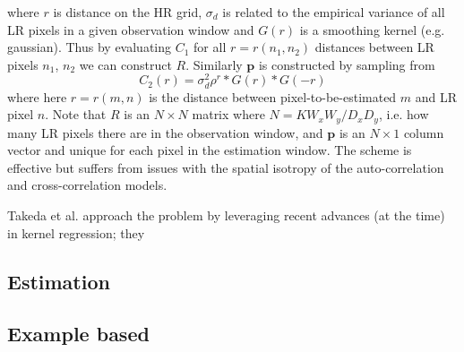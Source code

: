 where $r$ is distance on the HR grid, $\sigma_d$ is related to the empirical variance of all LR pixels in a given observation window and $G(r)$ is a smoothing kernel (e.g. gaussian).
%
Thus by evaluating $C_1$ for all $r = r(n_1, n_2)$ distances between LR pixels $n_1$, $n_2$ we can construct $R$.
%
Similarly $\bm{p}$ is constructed by sampling from
\begin{equation}
    C_2(r) = \sigma_d^2 \rho^{r} \ast G(r) \ast G(-r)
\end{equation}
where here $r = r(m, n)$ is the distance between pixel-to-be-estimated $m$ and LR pixel $n$.
%
Note that $R$ is an $N \times N$ matrix where $N = K W_x W_y/D_x D_y$, i.e. how many LR pixels there are in the observation window, and $\bm{p}$ is an $N \times 1$ column vector and unique for each pixel in the estimation window.
%
The scheme is effective but suffers from issues with the spatial isotropy of the auto-correlation and cross-correlation models.




Takeda et al.\cite{takeda} approach the problem by leveraging recent advances (at the time) in kernel regression; they
\subsection{Estimation}
\subsection{Example based}
